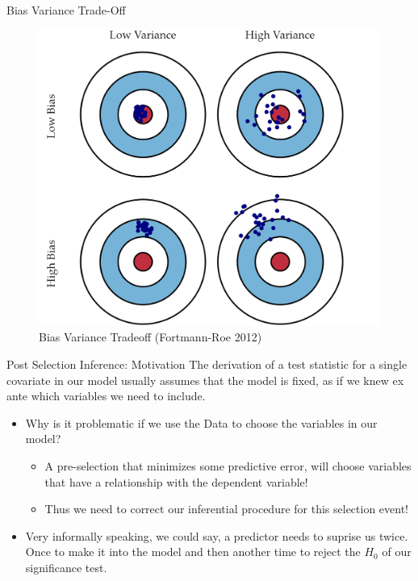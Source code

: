 \documentclass[
  11pt,
  ignorenonframetext,
]{beamer}
\providecommand{\tightlist}{%
  \setlength{\itemsep}{0pt}\setlength{\parskip}{0pt}}
\begin{document}
\begin{frame}{Bias Variance Trade-Off}
\protect\hypertarget{bias-variance-trade-off}{}
\begin{figure}

{\centering \includegraphics[width=0.8\linewidth]{./../figures/Bias_Variance} 

}

\caption{Bias Variance Tradeoff (Fortmann-Roe 2012)}\label{fig:unnamed-chunk-4}
\end{figure}
\end{frame}

\begin{frame}{Post Selection Inference: Motivation}
\protect\hypertarget{post-selection-inference-motivation}{}
The derivation of a test statistic for a single covariate in our model
usually assumes that the model is fixed, as if we knew ex ante which
variables we need to include.

\begin{itemize}
\tightlist
\item
  Why is it problematic if we use the Data to choose the variables in
  our model?

  \begin{itemize}
  \tightlist
  \item
    A pre-selection that minimizes some predictive error, will choose
    variables that have a relationship with the dependent variable!
  \item
    Thus we need to correct our inferential procedure for this selection
    event!
  \end{itemize}
\item
  Very informally speaking, we could say, a predictor needs to suprise
  us twice. Once to make it into the model and then another time to
  reject the \(H_0\) of our significance test.
\end{itemize}
\end{frame}
\end{document}
